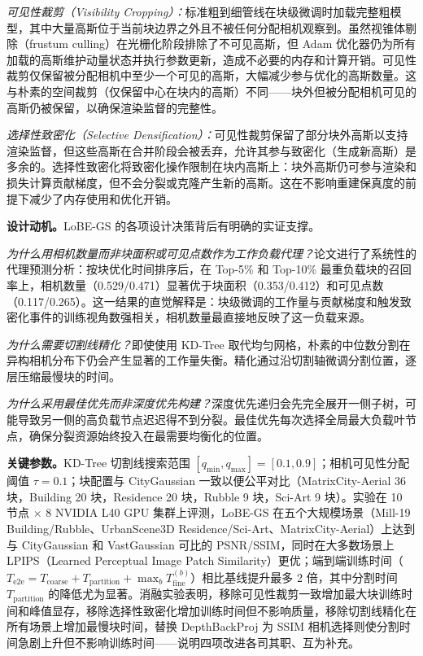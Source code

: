 \emph{可见性裁剪（Visibility Cropping）：}标准粗到细管线在块级微调时加载完整粗模型，其中大量高斯位于当前块边界之外且不被任何分配相机观察到。虽然视锥体剔除（frustum culling）在光栅化阶段排除了不可见高斯，但 Adam 优化器仍为所有加载的高斯维护动量状态并执行参数更新，造成不必要的内存和计算开销。可见性裁剪仅保留被分配相机中至少一个可见的高斯，大幅减少参与优化的高斯数量。这与朴素的空间裁剪（仅保留中心在块内的高斯）不同——块外但被分配相机可见的高斯仍被保留，以确保渲染监督的完整性。

\emph{选择性致密化（Selective Densification）：}可见性裁剪保留了部分块外高斯以支持渲染监督，但这些高斯在合并阶段会被丢弃，允许其参与致密化（生成新高斯）是多余的。选择性致密化将致密化操作限制在块内高斯上：块外高斯仍可参与渲染和损失计算贡献梯度，但不会分裂或克隆产生新的高斯。这在不影响重建保真度的前提下减少了内存使用和优化开销。

\textbf{设计动机。}LoBE-GS 的各项设计决策背后有明确的实证支撑。

\emph{为什么用相机数量而非块面积或可见点数作为工作负载代理？}论文进行了系统性的代理预测分析：按块优化时间排序后，在 Top-5\% 和 Top-10\% 最重负载块的召回率上，相机数量（0.529/0.471）显著优于块面积（0.353/0.412）和可见点数（0.117/0.265）。这一结果的直觉解释是：块级微调的工作量与贡献梯度和触发致密化事件的训练视角数强相关，相机数量最直接地反映了这一负载来源。

\emph{为什么需要切割线精化？}即使使用 KD-Tree 取代均匀网格，朴素的中位数分割在异构相机分布下仍会产生显著的工作量失衡。精化通过沿切割轴微调分割位置，逐层压缩最慢块的时间。

\emph{为什么采用最佳优先而非深度优先构建？}深度优先递归会先完全展开一侧子树，可能导致另一侧的高负载节点迟迟得不到分裂。最佳优先每次选择全局最大负载叶节点，确保分裂资源始终投入在最需要均衡化的位置。

\textbf{关键参数。}KD-Tree 切割线搜索范围 $[q_{\min}, q_{\max}] = [0.1, 0.9]$；相机可见性分配阈值 $\tau = 0.1$；块配置与 CityGaussian 一致以便公平对比（MatrixCity-Aerial 36 块，Building 20 块，Residence 20 块，Rubble 9 块，Sci-Art 9 块）。实验在 10 节点 $\times$ 8 NVIDIA L40 GPU 集群上评测，LoBE-GS 在五个大规模场景（Mill-19 Building/Rubble、UrbanScene3D Residence/Sci-Art、MatrixCity-Aerial）上达到与 CityGaussian 和 VastGaussian 可比的 PSNR/SSIM，同时在大多数场景上 LPIPS（Learned Perceptual Image Patch Similarity）更优；端到端训练时间（$T_{\text{e2e}} = T_{\text{coarse}} + T_{\text{partition}} + \max_b T_{\text{fine}}^{(b)}$）相比基线提升最多 2 倍，其中分割时间 $T_{\text{partition}}$ 的降低尤为显著。消融实验表明，移除可见性裁剪一致增加最大块训练时间和峰值显存，移除选择性致密化增加训练时间但不影响质量，移除切割线精化在所有场景上增加最慢块时间，替换 DepthBackProj 为 SSIM 相机选择则使分割时间急剧上升但不影响训练时间——说明四项改进各司其职、互为补充。

